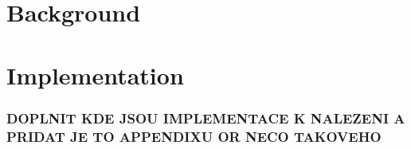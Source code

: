 \documentclass[twoside]{ctuthesis}
\theoremstyle{plain}
\theoremstyle{definition}
\theoremstyle{note}
\begin{document}
\maketitle



\part{Background}







\part{Implementation}












\section{DOPLNIT KDE JSOU IMPLEMENTACE K NALEZENI A PRIDAT JE TO APPENDIXU OR NECO TAKOVEHO}

\appendix






\end{document}
